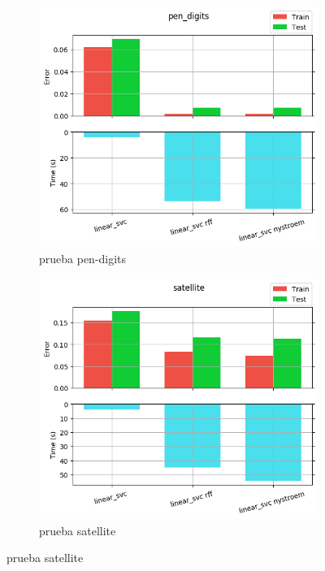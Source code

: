 \begin{figure}[ht]
  \centering
  \begin{subfigure}[b]{0.5\linewidth}
    \centering\captionsetup{width=.8\linewidth}\includegraphics[width=\imgscale\linewidth]{Figures/2_5/pen_digits}
    \caption{prueba pen-digits}
    \label{fig:2_5_pen_digits}
  \end{subfigure}%
  \begin{subfigure}[b]{0.5\linewidth}
    \centering\captionsetup{width=.8\linewidth}\includegraphics[width=\imgscale\linewidth]{Figures/2_5/satellite}
    \caption{prueba satellite}
    \label{fig:2_5_satellite}
  \end{subfigure}
\end{figure}

